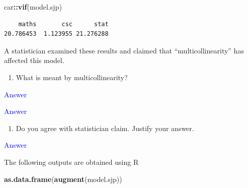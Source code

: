 \documentclass[]{article}
\newenvironment{Shaded}{\begin{snugshade}}{\end{snugshade}}
\newcommand{\KeywordTok}[1]{\textcolor[rgb]{0.13,0.29,0.53}{\textbf{#1}}}
\newcommand{\NormalTok}[1]{#1}
\newcommand{\OperatorTok}[1]{\textcolor[rgb]{0.81,0.36,0.00}{\textbf{#1}}}
\providecommand{\tightlist}{%
  \setlength{\itemsep}{0pt}\setlength{\parskip}{0pt}}
\begin{document}
\begin{Shaded}
\begin{Highlighting}[]
\NormalTok{car}\OperatorTok{::}\KeywordTok{vif}\NormalTok{(model.sjp)}
\end{Highlighting}
\end{Shaded}

\begin{verbatim}
    maths       csc      stat 
20.786453  1.123955 21.276288 
\end{verbatim}

A statistician examined these results and claimed that
``multicollinearity'' has affected this model.

\begin{enumerate}
\def\labelenumi{\roman{enumi})}
\tightlist
\item
  What is meant by multicollinearity?
\end{enumerate}

\textcolor{blue}{Answer}

\newpage

\textcolor{blue}{Answer}

\newpage

\begin{enumerate}
\def\labelenumi{\roman{enumi})}
\setcounter{enumi}{1}
\tightlist
\item
  Do you agree with statistician claim. Justify your answer.
\end{enumerate}

\textcolor{blue}{Answer}

\newpage

The following outputs are obtained using R

\begin{Shaded}
\begin{Highlighting}[]
\KeywordTok{as.data.frame}\NormalTok{(}\KeywordTok{augment}\NormalTok{(model.sjp))}
\end{Highlighting}
\end{Shaded}
\end{document}
